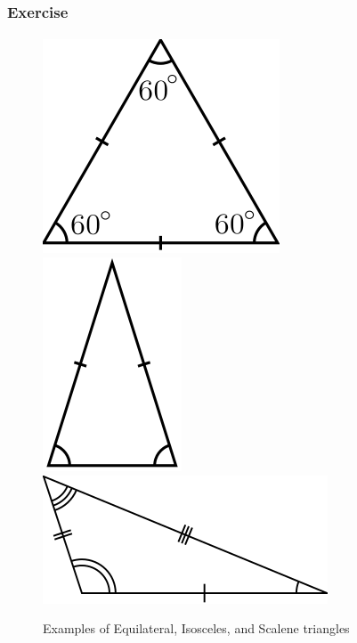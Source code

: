 \documentclass[]{beamer}
\begin{document}
\begin{frame}
  \frametitle{Exercise}
  \framesubtitle{}


\begin{figure}[h]
\centering
\includegraphics[scale=0.25]{images/triangleEquilateral}~~~~~~~
\includegraphics[scale=0.250]{images/triangleIsosceles}~~~~~~~
\includegraphics[scale=0.250]{images/triangleScalene}
\caption{Examples of Equilateral, Isosceles, and Scalene triangles}
\label{fig:triangles}
\end{figure}


\end{frame}
\end{document}
